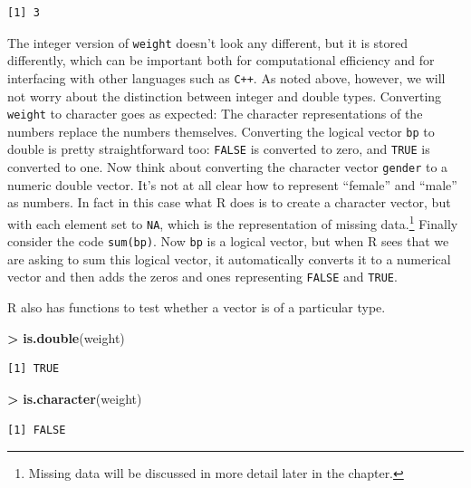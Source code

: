 \documentclass[]{krantz}
\makeatletter
\newenvironment{Shaded}{\begin{snugshade}}{\end{snugshade}}
\newcommand{\KeywordTok}[1]{\textcolor[rgb]{0.27,0.27,0.27}{\textbf{#1}}}
\newcommand{\StringTok}[1]{\textcolor[rgb]{0.5,0.5,0.5}{#1}}
\newcommand{\OperatorTok}[1]{\textcolor[rgb]{0.43,0.43,0.43}{\textbf{#1}}}
\newcommand{\NormalTok}[1]{#1}
\newenvironment{kframe}{%
\medskip{}
\setlength{\fboxsep}{.8em}
 \def\at@end@of@kframe{}%
 \ifinner\ifhmode%
  \def\at@end@of@kframe{\end{minipage}}%
  \begin{minipage}{\columnwidth}%
 \fi\fi%
 \def\FrameCommand##1{\hskip\@totalleftmargin \hskip-\fboxsep
 \colorbox{shadecolor}{##1}\hskip-\fboxsep
     \hskip-\linewidth \hskip-\@totalleftmargin \hskip\columnwidth}%
 \MakeFramed {\advance\hsize-\width
   \@totalleftmargin\z@ \linewidth\hsize
   \@setminipage}}%
 {\par\unskip\endMakeFramed%
 \at@end@of@kframe}
\renewenvironment{Shaded}{\begin{kframe}}{\end{kframe}}
\makeatother
\begin{document}
\begin{verbatim}
[1] 3
\end{verbatim}

The integer version of \texttt{weight} doesn't look any different, but
it is stored differently, which can be important both for computational
efficiency and for interfacing with other languages such as
\texttt{C++}. As noted above, however, we will not worry about the
distinction between integer and double types. Converting \texttt{weight}
to character goes as expected: The character representations of the
numbers replace the numbers themselves. Converting the logical vector
\texttt{bp} to double is pretty straightforward too: \texttt{FALSE} is
converted to zero, and \texttt{TRUE} is converted to one. Now think
about converting the character vector \texttt{gender} to a numeric
double vector. It's not at all clear how to represent ``female'' and
``male'' as numbers. In fact in this case what R does is to create a
character vector, but with each element set to \texttt{NA}, which is the
representation of missing data.\footnote{Missing data will be discussed
  in more detail later in the chapter.} Finally consider the code
\texttt{sum(bp)}. Now \texttt{bp} is a logical vector, but when R sees
that we are asking to sum this logical vector, it automatically converts
it to a numerical vector and then adds the zeros and ones representing
\texttt{FALSE} and \texttt{TRUE}.

R also has functions to test whether a vector is of a particular type.

\begin{Shaded}
\begin{Highlighting}[]
\OperatorTok{>}\StringTok{ }\KeywordTok{is.double}\NormalTok{(weight)}
\end{Highlighting}
\end{Shaded}

\begin{verbatim}
[1] TRUE
\end{verbatim}

\begin{Shaded}
\begin{Highlighting}[]
\OperatorTok{>}\StringTok{ }\KeywordTok{is.character}\NormalTok{(weight)}
\end{Highlighting}
\end{Shaded}

\begin{verbatim}
[1] FALSE
\end{verbatim}
\end{document}
